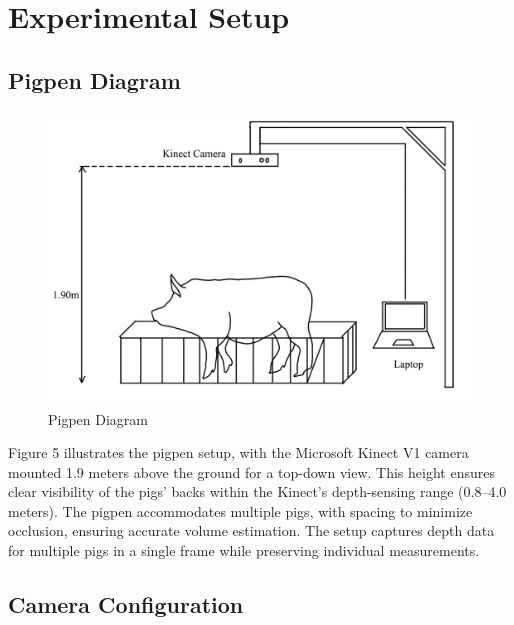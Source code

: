 {\section{Experimental Setup}

\newpage

\subsection {Pigpen Diagram}

\begin{figure}[h]
	\centering
	\includegraphics[height=0.4\textheight]{figures/pigpen_diagram}
	\caption{Pigpen Diagram}
	\label{fig:Pigpen Diagram}
\end{figure}

Figure 5 illustrates the pigpen setup, with the Microsoft Kinect V1 camera mounted 1.9 meters above the ground for a top-down view. This height ensures clear visibility of the pigs’ backs within the Kinect’s depth-sensing range (0.8–4.0 meters). The pigpen accommodates multiple pigs, with spacing to minimize occlusion, ensuring accurate volume estimation. The setup captures depth data for multiple pigs in a single frame while preserving individual measurements.

\newpage

\subsection{Camera Configuration}

}
